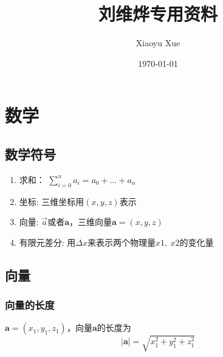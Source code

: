 \documentclass[a4paper,oneside,12pt]{article}
\title{刘维烨专用资料}
\author{Xiaoyu Xue}
\date{\today}
\newcommand{\bol}[1]{\textbf{#1}}
\begin{document}
\maketitle
\section{数学}
\subsection{数学符号}
\begin{enumerate}
	\item 求和： $\displaystyle \sum_{i = 0} ^ n a_i = a_0 + \ldots + a_n$
	\item 坐标: 三维坐标用$(x,y,z)$表示
	\item 向量: $\vec{a}$或者$\bol{a}$，三维向量$\bol{a} = (x,y,z)$
	\item 有限元差分: 用$\Delta x$来表示两个物理量$x1,~x2$的变化量
\end{enumerate}
\subsection{向量}
\subsubsection{向量的长度}
$\bol{a} = (x_1, y_1, z_1)$，向量$\bol{a}$的长度为
\begin{displaymath}
\vert \bol{a} \vert = \sqrt{x_1^2 + y_1^2 + z_1^2}
\end{displaymath}
\end{document}
